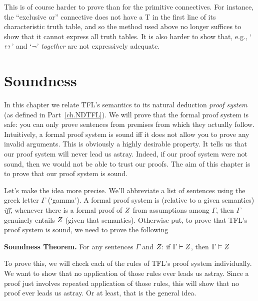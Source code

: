 This is of course harder to prove than for the primitive connectives. For instance, the ``exclusive or'' connective does not have a T in the first line of its characteristic truth table, and so the method used above no longer suffices to show that it cannot express all truth tables.  It is also harder to show that, e.g., `$\leftrightarrow$' and `$\neg$' \emph{together} are not expressively adequate.



\chapter{Soundness}\label{ch:Soundness}

In this chapter we relate TFL's semantics to its natural deduction \emph{proof system} (as defined in Part~\ref{ch.NDTFL}). We will prove that the formal proof system is safe: you can only prove sentences from premises from which they actually follow.
Intuitively, a formal proof system is sound iff it does not allow you to prove any invalid arguments. This is obviously a highly desirable property. It tells us that our proof system will never lead us astray. Indeed, if our proof system were not sound, then we would not be able to trust our proofs. The aim of this chapter is to prove that our proof system is sound.

Let's make the idea more precise. We'll abbreviate a list of sentences using the greek letter $\Gamma$ (`gamma'). A formal proof system is  (relative to a given semantics) \emph{iff}, whenever there is a formal proof of $Z$ from assumptions among $\Gamma$, then $\Gamma$ genuinely entails $Z$ (given that semantics). Otherwise put, to prove that TFL's proof system is sound, we need to prove the following

\begin{highlighted}\textbf{Soundness Theorem.} For any sentences $\Gamma$ and $Z$: if $\Gamma\vdash Z$, then $\Gamma \vDash Z$
\end{highlighted}

To prove this, we will check each of the rules of TFL's proof system individually. We want to show that no application of those rules ever leads us astray. Since a proof just involves repeated application of those rules, this will show that no proof ever leads us astray. Or at least, that is the general idea.

